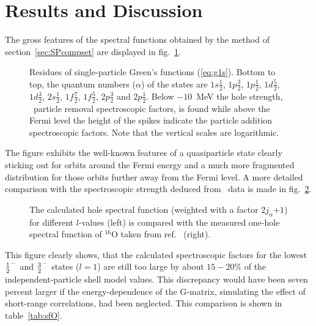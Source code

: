 \section{Results and Discussion\label{sec:SPsoldys}}
The  gross features of the spectral functions obtained by the method of 
section~\ref{sec:SPcompset} are displayed in  fig.~\ref{fig:sfO}.
\begin{figure}
\centerline{%
\hspace{-0.8cm}%
}
\caption[]{Residues of single-particle Green's functions (\ref{eq:g1s}).
Bottom to top, the quantum numbers ($\alpha$) of the states are
 $1s\frac{1}{2}$,
 $1p\frac{3}{2}$,
 $1p\frac{1}{2}$,
 $1d\frac{5}{2}$,
 $1d\frac{3}{2}$,
 $2s\frac{1}{2}$,
 $1f\frac{7}{2}$,
 $1f\frac{5}{2}$,
 $2p\frac{3}{2}$ and
 $2p\frac{1}{2}$. Below $-10$~MeV the hole strength, \ie\ particle removal 
spectroscopic factors, is found while above the Fermi level the height of the 
spikes indicate the particle addition spectroscopic factors.
Note that the vertical scales are logarithmic.
\label{fig:sfO}}
\end{figure}
The figure exhibits the well-known features of a quasiparticle state clearly 
sticking out for orbits around the Fermi energy and a much more fragmented 
distribution for those orbits further away from the Fermi level. A more 
detailed comparison with the spectroscopic strength deduced from \eep\ 
data\cite{Leu94} is made in fig.~\ref{fig:Leus}.
\begin{figure}
\centerline{%
\hspace{-0.8cm}%
}
\caption[]{
The calculated hole spectral function (weighted with a factor 
\mbox{$2j_\alpha$$+$$1$}) for
different $l$-values (left) is compared with the measured one-hole spectral 
function of $^{16}$O taken from ref.~\cite{Leu94} (right). 
\label{fig:Leus}}
\end{figure}
This figure clearly shows, that the calculated spectroscopic factors for the 
lowest ${\mbox{$\frac{1}{2}$}}^-$ and ${\mbox{$\frac{3}{2}$}}^-$ states ($l=1$) are still too large by about 
$15-20$\% of the independent-particle shell model values. 
This discrepancy would 
have been seven percent larger if the energy-dependence of the G-matrix, 
simulating the effect of short-range correlations, had been neglected. 
This comparison is shown in table~\ref{tab:sfO}.
